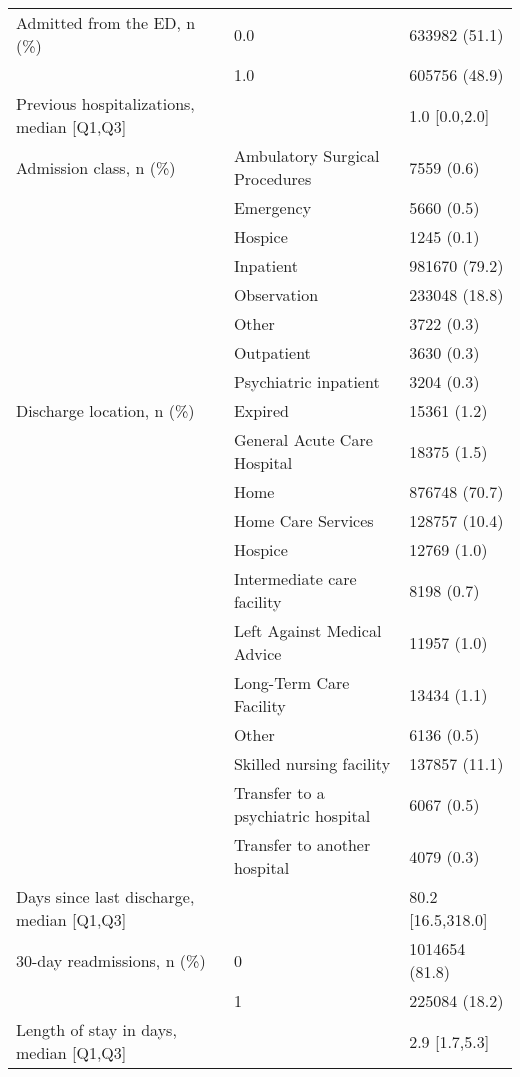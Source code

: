 \begin{tabular}{lll}
Admitted from the ED, n (\%) & 0.0 &      633982 (51.1) \\
                                       & 1.0 &      605756 (48.9) \\
Previous hospitalizations, median [Q1,Q3] &   &      1.0 [0.0,2.0] \\
Admission class, n (\%) & Ambulatory Surgical Procedures &         7559 (0.6) \\
                                       & Emergency &         5660 (0.5) \\
                                       & Hospice &         1245 (0.1) \\
                                       & Inpatient &      981670 (79.2) \\
                                       & Observation &      233048 (18.8) \\
                                       & Other &         3722 (0.3) \\
                                       & Outpatient &         3630 (0.3) \\
                                       & Psychiatric inpatient &         3204 (0.3) \\
Discharge location, n (\%) & Expired &        15361 (1.2) \\
                                       & General Acute Care Hospital &        18375 (1.5) \\
                                       & Home &      876748 (70.7) \\
                                       & Home Care Services &      128757 (10.4) \\
                                       & Hospice &        12769 (1.0) \\
                                       & Intermediate care facility &         8198 (0.7) \\
                                       & Left Against Medical Advice &        11957 (1.0) \\
                                       & Long-Term Care Facility &        13434 (1.1) \\
                                       & Other &         6136 (0.5) \\
                                       & Skilled nursing facility &      137857 (11.1) \\
                                       & Transfer to a psychiatric hospital &         6067 (0.5) \\
                                       & Transfer to another hospital &         4079 (0.3) \\
Days since last discharge, median [Q1,Q3] &   &  80.2 [16.5,318.0] \\
30-day readmissions, n (\%) & 0 &     1014654 (81.8) \\
                                       & 1 &      225084 (18.2) \\
Length of stay in days, median [Q1,Q3] &   &      2.9 [1.7,5.3] \\
\bottomrule
\end{tabular}
